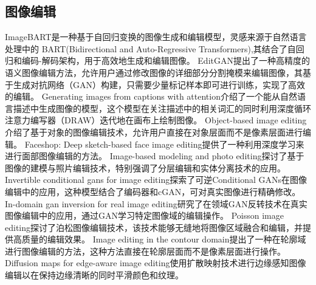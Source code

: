 \documentclass[a4paper,AutoFakeBold,oneside,12pt]{book}
\begin{document}
\subsection{图像编辑}
ImageBART\cite{esser2021imagebart}是一种基于自回归变换的图像生成和编辑模型，灵感来源于自然语言处理中的 BART(Bidirectional and Auto-Regressive Transformers)\cite{lewis2019bart},其结合了自回归和编码-解码架构，用于高效地生成和编辑图像。
EditGAN\cite{ling2021editgan}提出了一种高精度的语义图像编辑方法，允许用户通过修改图像的详细部分分割掩模来编辑图像，其基于生成对抗网络（GAN）构建，只需要少量标记样本即可进行训练，实现了高效的编辑。
Generating images from captions with attention\cite{mansimov2015generating}介绍了一个能从自然语言描述中生成图像的模型，这个模型在关注描述中的相关词汇的同时利用深度循环注意力编写器（DRAW）迭代地在画布上绘制图像。
Object-based image editing\cite{barrett2002object}介绍了基于对象的图像编辑技术，允许用户直接在对象层面而不是像素层面进行编辑。
Faceshop: Deep sketch-based face image editing\cite{portenier2018faceshop}提供了一种利用深度学习来进行面部图像编辑的方法。
Image-based modeling and photo editing\cite{oh2001image}探讨了基于图像的建模与照片编辑技术，特别强调了分层编辑和实体分离技术的应用。
Invertible conditional gans for image editing\cite{perarnau2016invertible}探索了可逆Conditional GANs在图像编辑中的应用，这种模型结合了编码器和cGAN，可对真实图像进行精确修改。
In-domain gan inversion for real image editing\cite{zhu2020domain}研究了在领域GAN反转技术在真实图像编辑中的应用，通过GAN学习特定图像域的编辑操作。
Poisson image editing\cite{di2016poisson}探讨了泊松图像编辑技术，该技术能够无缝地将图像区域融合和编辑，并提供高质量的编辑效果。
Image editing in the contour domain\cite{elder1998image}提出了一种在轮廓域进行图像编辑的方法，这种方法直接在轮廓层面而不是像素层面进行操作。
Diffusion maps for edge-aware image editing\cite{farbman2010diffusion}使用扩散映射技术进行边缘感知图像编辑以在保持边缘清晰的同时平滑颜色和纹理。
\end{document}
